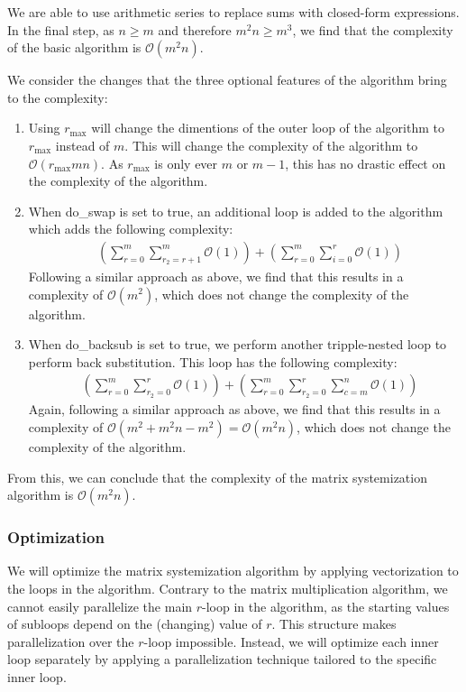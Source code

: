 \documentclass[11pt,a4paper]{report}
\theoremstyle{definition}
\begin{document}
We are able to use arithmetic series to replace sums with closed-form expressions. In the final step, as $n \geq m$ and therefore $m^2n \geq m^3$, we find that the complexity of the basic algorithm is $\mathcal{O}(m^2n)$.

We consider the changes that the three optional features of the algorithm bring to the complexity:
\begin{enumerate}
  \item Using $r_\text{max}$ will change the dimentions of the outer loop of the algorithm to $r_\text{max}$ instead of $m$. This will change the complexity of the algorithm to $\mathcal{O}(r_\text{max}mn)$. As $r_\text{max}$ is only ever $m$ or $m-1$, this has no drastic effect on the complexity of the algorithm.
  \item When do\_swap is set to true, an additional loop is added to the algorithm which adds the following complexity:
  \begin{align*}
    & \left( \sum_{r=0}^{m} \sum_{r_2=r+1}^{m} \mathcal{O}(1) \right) + \left( \sum_{r=0}^{m} \sum_{i=0}^{r} \mathcal{O}(1) \right)
  \end{align*}
  Following a similar approach as above, we find that this results in a complexity of $\mathcal{O}(m^2)$, which does not change the complexity of the algorithm.
  \item When do\_backsub is set to true, we perform another tripple-nested loop to perform back substitution. This loop has the following complexity:
  \begin{align*}
    & \left( \sum_{r=0}^{m} \sum_{r_2=0}^{r} \mathcal{O}(1) \right) + \left( \sum_{r=0}^{m} \sum_{r_2=0}^{r} \sum_{c=m}^{n} \mathcal{O}(1) \right)
  \end{align*}
  Again, following a similar approach as above, we find that this results in a complexity of $\mathcal{O}(m^2 + m^2n - m^2) = \mathcal{O}(m^2n)$, which does not change the complexity of the algorithm.
\end{enumerate}
From this, we can conclude that the complexity of the matrix systemization algorithm is $\mathcal{O}(m^2n)$.

\subsubsection{Optimization}
\label{sec:matrixsystemizationoptimization}
We will optimize the matrix systemization algorithm by applying vectorization to the loops in the algorithm. Contrary to the matrix multiplication algorithm, we cannot easily parallelize the main $r$-loop in the algorithm, as the starting values of subloops depend on the (changing) value of $r$. This structure makes parallelization over the $r$-loop impossible. Instead, we will optimize each inner loop separately by applying a parallelization technique tailored to the specific inner loop.
\end{document}
